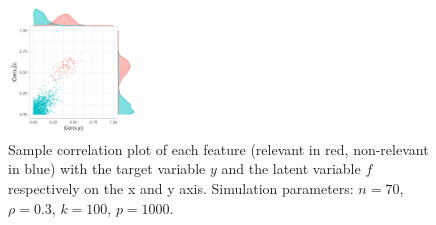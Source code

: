 \documentclass[american,]{article}
\theoremstyle{definition}
\begin{document}
\begin{figure}[tp]
  \centering
  \includegraphics[width=0.3\textwidth]{graphics/correlation.pdf}
  \caption{Sample correlation plot of each feature (relevant in red, non-relevant in blue) with the target variable $y$ and the latent variable $f$ respectively on the x and y axis. Simulation parameters: $n=70$, $\rho=0.3$, $k=100$, $p=1000$.\\}
  \label{fig:correlation}
\end{figure}
\end{document}

